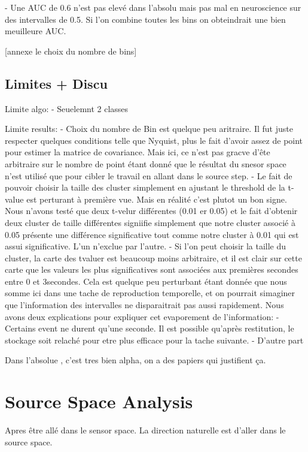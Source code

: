 - Une AUC de 0.6 n'est pas elevé dans l'absolu mais pas mal en neuroscience sur des intervalles de 0.5. Si l'on combine toutes les bins on obteindrait une bien meuilleure AUC.


[annexe le choix du nombre de bins]


\subsection{Limites + Discu}

Limite algo:
- Seuelemnt 2 classes

Limite results:
- Choix du nombre de Bin est quelque peu aritraire. Il fut juste respecter quelques conditions telle que Nyquist, plus le fait d'avoir assez de point pour estimer la matrice de covariance. Mais ici, ce n'est pas gracve d'ête arbitraire sur le nombre de point étant donné que le résultat du snesor space n'est utilisé que pour cibler le travail en allant dans le source step.
- Le fait de pouvoir choisir la taille des cluster simplement en ajustant le threshold de la t-value est perturant à première vue. Mais en réalité c'est plutot un bon signe. Nous n'avons testé que deux t-velur différentes (0.01 er 0.05) et le fait d'obtenir deux cluster de taille différentes signiifie simplement que notre cluster associé à 0.05 présente une différence significative tout comme notre cluster à 0.01 qui est assui significative. L'un n'exclue par l'autre.
- Si l'on peut choisir la taille du cluster, la carte des tvaluer est beaucoup moins arbitraire, et il est clair sur cette carte que les valeurs les plus significatives sont associées aux premières secondes entre 0 et 3secondes. Cela est quelque peu perturbant étant donnée que nous somme ici dans une tache de reproduction temporelle, et on pourrait simaginer que l'information des intervalles ne disparaitrait pas aussi rapidement. Nous avons deux explications pour expliquer cet evaporement de l'information:
- Certains event ne durent qu'une seconde. Il est possible qu'après restitution, le stockage soit relaché pour etre plus efficace pour la tache suivante.
- D'autre part 


Dans l'absolue , c'est tres bien alpha, on a des papiers qui justifient ça. \cite{obleser2012adverse}

\section{Source Space Analysis}

Apres être allé dans le sensor space. La direction naturelle est d'aller dans le source space.


